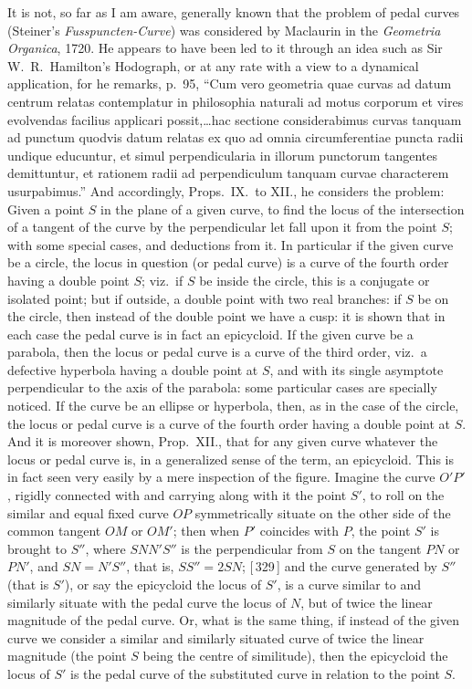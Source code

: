 \documentclass[11pt,a4paper]{article}
\begin{document}
\noindent It is not, so far as I am aware, generally known that the problem of pedal curves (Steiner's \textit{Fusspuncten-Curve}) was considered by Maclaurin in the \textit{Geometria Organica}, 1720. He appears to have been led to it through an idea such as Sir W.\ R.\ Hamilton's Hodograph, or at any rate with a view to a dynamical application, for he remarks, p.\ 95, ``Cum vero geometria quae curvas ad datum centrum relatas contemplatur in philosophia naturali ad motus corporum et vires evolvendas facilius applicari possit,\ldots hac sectione considerabimus curvas tanquam ad punctum quodvis datum relatas ex quo ad omnia circumferentiae puncta radii undique educuntur, et simul perpendicularia in illorum punctorum tangentes demittuntur, et rationem radii ad perpendiculum tanquam curvae characterem usurpabimus.'' And accordingly, Props.\ IX.\ to XII., he considers the problem: Given a point $S$ in the plane of a given curve, to find the locus of the intersection of a tangent of the curve by the perpendicular let fall upon it from the point $S$; with some special cases, and deductions from it. In particular if the given curve be a circle, the locus in question (or pedal curve) is a curve of the fourth order having a double point $S$; viz.\ if $S$ be inside the circle, this is a conjugate or isolated point; but if outside, a double point with two real branches: if $S$ be on the circle, then instead of the double point we have a cusp: it is shown that in each case the pedal curve is in fact an epicycloid. If the given curve be a parabola, then the locus or pedal curve is a curve of the third order, viz.\ a defective hyperbola having a double point at $S$, and with its single asymptote perpendicular to the axis of the parabola: some particular cases are specially noticed. If the curve be an ellipse or hyperbola, then, as in the case of the circle, the locus or pedal curve is a curve of the fourth order having a double point at $S$. And it is moreover shown, Prop.\ XII., that for any given curve whatever the locus or pedal curve is, in a generalized sense of the term, an epicycloid. This is in fact seen very easily by a mere inspection of the figure. Imagine the curve $O'P'$, rigidly connected with and carrying along with it the point $S'$, to roll on the similar and equal fixed curve $OP$ symmetrically situate on the other side of the common tangent $OM$ or $OM'$; then when $P'$ coincides with $P$, the point $S'$ is brought to $S''$, where $SNN'S''$ is the perpendicular from $S$ on the tangent $PN$ or $PN'$, and $SN = N'S''$, that is, $SS'' = 2SN$; [\,329\,] and the curve generated by $S''$ (that is $S'$), or say the epicycloid the locus of $S'$, is a curve similar to and similarly situate with the pedal curve the locus of $N$, but of twice the linear magnitude of the pedal curve. Or, what is the same thing, if instead of the given curve we consider a similar and similarly situated curve of twice the linear magnitude (the point $S$ being the centre of similitude), then the epicycloid the locus of $S'$ is the pedal curve of the substituted curve in relation to the point $S$.
\end{document}
